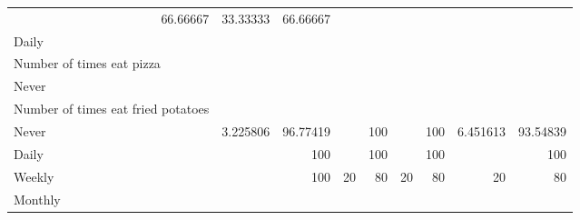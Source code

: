 \documentclass{article}
\begin{document}
\begin{tabular}{lllllllll}
  \multicolumn{1}{r}{66.66667} &
  \multicolumn{1}{r}{33.33333} &
  \multicolumn{1}{r}{66.66667} \\
\multicolumn{1}{l}{\hspace{3em}Daily} &
  \multicolumn{1}{|r}{} &
  \multicolumn{1}{r}{} &
  \multicolumn{1}{r}{} &
  \multicolumn{1}{r}{} &
  \multicolumn{1}{r}{} &
  \multicolumn{1}{r}{} &
  \multicolumn{1}{r}{} &
  \multicolumn{1}{r}{} \\
\multicolumn{1}{l}{\hspace{4em}Number of times eat pizza} &
  \multicolumn{1}{|r}{} &
  \multicolumn{1}{r}{} &
  \multicolumn{1}{r}{} &
  \multicolumn{1}{r}{} &
  \multicolumn{1}{r}{} &
  \multicolumn{1}{r}{} &
  \multicolumn{1}{r}{} &
  \multicolumn{1}{r}{} \\
\multicolumn{1}{l}{\hspace{5em}Never} &
  \multicolumn{1}{|r}{} &
  \multicolumn{1}{r}{} &
  \multicolumn{1}{r}{} &
  \multicolumn{1}{r}{} &
  \multicolumn{1}{r}{} &
  \multicolumn{1}{r}{} &
  \multicolumn{1}{r}{} &
  \multicolumn{1}{r}{} \\
\multicolumn{1}{l}{\hspace{6em}Number of times eat fried potatoes} &
  \multicolumn{1}{|r}{} &
  \multicolumn{1}{r}{} &
  \multicolumn{1}{r}{} &
  \multicolumn{1}{r}{} &
  \multicolumn{1}{r}{} &
  \multicolumn{1}{r}{} &
  \multicolumn{1}{r}{} &
  \multicolumn{1}{r}{} \\
\multicolumn{1}{l}{\hspace{7em}Never} &
  \multicolumn{1}{|r}{3.225806} &
  \multicolumn{1}{r}{96.77419} &
  \multicolumn{1}{r}{} &
  \multicolumn{1}{r}{100} &
  \multicolumn{1}{r}{} &
  \multicolumn{1}{r}{100} &
  \multicolumn{1}{r}{6.451613} &
  \multicolumn{1}{r}{93.54839} \\
\multicolumn{1}{l}{\hspace{7em}Daily} &
  \multicolumn{1}{|r}{} &
  \multicolumn{1}{r}{100} &
  \multicolumn{1}{r}{} &
  \multicolumn{1}{r}{100} &
  \multicolumn{1}{r}{} &
  \multicolumn{1}{r}{100} &
  \multicolumn{1}{r}{} &
  \multicolumn{1}{r}{100} \\
\multicolumn{1}{l}{\hspace{7em}Weekly} &
  \multicolumn{1}{|r}{} &
  \multicolumn{1}{r}{100} &
  \multicolumn{1}{r}{20} &
  \multicolumn{1}{r}{80} &
  \multicolumn{1}{r}{20} &
  \multicolumn{1}{r}{80} &
  \multicolumn{1}{r}{20} &
  \multicolumn{1}{r}{80} \\
\multicolumn{1}{l}{\hspace{7em}Monthly} &
  \multicolumn{1}{|r}{} &

\end{tabular}
\end{document}
